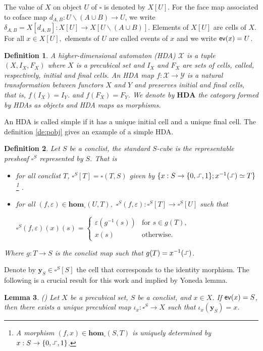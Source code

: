 \documentclass[11pt,a4paper,oldfontcommands]{memoir}
\newcommand*\ev{\textup{\textsf{ev}}}
\newcommand*\exec{%
  \raisebox{1pt}{%
    \begin{tikzpicture}[x=.8ex,y=1ex,-]
      \draw (0,0) -- (1,0) -- (1,1) -- (2,1);
    \end{tikzpicture}}}
\newtheorem{definition}{Definition}
\newtheorem{lemma}[definition]{Lemma}
\begin{document}
The value of $X$ on object $U$ of $\square$ is denoted by $X[U]$. For the face map associated to coface map $d_{A, B}: U \backslash(A \cup B) \rightarrow U$, we write $\delta_{A, B}=X\left[d_{A, B}\right]: X[U] \rightarrow X[U \backslash(A \cup B)]$. Elements of $X[U]$ are cells of $X$. For all $x \in X[U],$ elements of $U$ are called events of $x$ and we write $\ev(x)=U$.

\begin{definition}
    A higher-dimensional automaton (HDA) $\mathcal{X}$ is a tuple $(X, I_X, F_X)$ where $X$ is a precubical set and $I_X$ and $F_X$ are sets of cells, called, respectively, initial and final cells. An HDA map $f: \mathcal{X} \rightarrow \mathcal{Y}$ is a natural transformation between functors $X$ and $Y$ and preserves initial and final cells, that is, $f(I_X) = I_Y$. and $f(F_X) = F_Y$. We denote by $\mathbf{HDA}$ the category formed by HDAs as objects and HDA maps as morphisms.
\end{definition}
 An HDA is called simple if it has a unique initial cell and a unique final cell. The definition \ref{de:pobj} gives an example of a simple HDA.

  \begin{definition}\label{def: standard cube}
      Let $S$ be a conclist, the standard $S$-cube is the representable presheaf $\square^S$ represented by $S$.  
      That is
\begin{itemize}
    \item for all conclist $T$, $\square^S[T]=\square(T,S)$ given by $\{ x: S \rightarrow \{ 0, \exec,1 \}; x^{-1}(\exec) \simeq T \}$\footnote{A morphism $(f,x) \in  \mathbf{hom}_{\square}(S,T)$ is uniquely determined by $x: S \to \{0, \exec, 1 \}$.} .
    \item for all $(f,\varepsilon) \in \mathbf{hom}_{\square}(U,T),$ $\square^S (f,\varepsilon): \square^S[T] \to \square^S[U]$ such that
    
    $\square^S (f,\varepsilon)(x)(s)=    \begin{cases}
        \varepsilon(g^{-1}(s)) & \text{for $s\in g(T)$}, \\
        x(s) & \text{otherwise}.
      \end{cases}$
\end{itemize}
Where $g:T \to S$ is the conclist map such that $g(T)=x^{-1}(\exec)$.
 \end{definition}
 Denote by $\mathbf{y}_S \in \square^S[S]$ the cell that corresponds to the identity morphism. The following is a crucial result for this work and implied by Yoneda lemma.
 \begin{lemma}{(\cite{LanguageofHDA})} \label{lemma: Yoneda lemma}
     Let $X$ be a precubical set, $S$ be a conclist, and $x \in X$. If $\ev(x)=S$, then there exists a unique precubical map $\iota_x: \square^S \to X$ such that $\iota_x(\mathbf{y}_S)=x$.
 \end{lemma}
\end{document}
